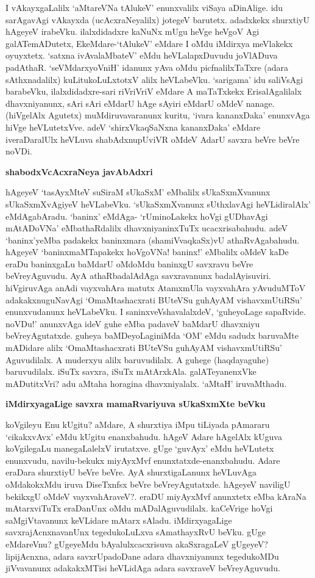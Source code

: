 I vAkayxgaLalilx `aMtareVNa tAlukeV' enunxvalilx viSaya aDinAlige. idu sarAgavAgi vAkayxda (ucAcxraNeyalilx) jotegeV barutetx. adadxkekx shurxtiyU hAgeyeV irabeVku. ilalxdidadxre kaNuNx mUgu heVge heVgoV Agi galATemADutetx, EkeMdare-`tAlukeV' eMdare I oMdu iMdirxya meVlakekx oyuyxtetx. `satxna ivAvalaMbateV' eMdu heVLalapxDuvudu joVlADuva padAthaR. `seVMdarxyoVniH' idanunx yAva oMdu picfnalilxTaTxre (adara sAthxnadalilx) kuLitukoLuLxtotxV alilx heVLabeVku. `sarigama' idu saliVsAgi barabeVku, ilalxdidadxre-sari riVriVriV eMdare A maTaTxkekx ErisalAgalilalx dhavxniyanunx, sAri sAri eMdarU hAge sAyiri eMdarU oMdeV nanage. (hiVgelAlx Agutetx) muMdiruvavaranunx kuritu, `ivara kananxDaka' enunxvAga hiVge heVLutetxVve. adeV `shirxVkaqSaNxna kananxDaka' eMdare iveraDaralUlx heVLuva shabAdxnupUviVR oMdeV AdarU savxra beVre beVre noVDi.

\noindent
\textbf{shabodxVcAcxraNeya javAbAdxri}\label{page124}

hAgeyeV `tasAyxMteV suSiraM sUkaSxM' eMbalilx sUkaSxmXvanunx sUkaSxmXvAgiyeV heVLabeVku. `sUkaSxmXvanunx sUthxlavAgi heVLidiralAlx' 
eMdAgabAradu. `baninx' eMdAga- `rUminoLakekx hoVgi gUDhavAgi mAtADoVNa' eMbathaRdalilx dhavxniyaninxTuTx ucacxrisabahudu. adeV `baninx'yeMba padakekx baninxmara (shamiVvaqkaSx)vU athaRvAgabahudu. hAgeyeV `baninxmaMTapakekx hoVgoVNa! baninx!' eMbalilx oMdeV kaDe eraDu baninxgaLu baMdarU oMdoMdu baninxgU savxravu beVre beVreyAguvudu. AyA athaRbadalAdAga savxravanunx badalAyisuviri. hiVgiruvAga anAdi vayxvahAra matutx AtamxmUla vayxvahAra yAvuduMToV adakakxnuguNavAgi `OmaMtashacxrati BUteVSu guhAyAM vishavxmUtiRSu'\label{125} enunxvudanunx heVLabeVku. I saninxveVshavalalxdeV, `guheyoLage sapaRvide. noVDu!' anunxvAga ideV guhe eMba padaveV baMdarU dhavxniyu beVreyAgutatxde. guheya baMDeyoLaginiMda `OM' eMdu sadudx baruvaMte mADidare alilx `OmaMtashacxrati BUteVSu guhAyAM vishavxmUtiRSu' Aguvudilalx. A muderxyu alilx baruvudilalx. A guhege (haqdayaguhe) baruvudilalx. iSuTx savxra, iSuTx mAtArxkAla. galATeyanenxVke mADutitxVri? adu aMtaha horagina dhavxniyalalx. `aMtaH' iruvaMthadu.

\noindent
\textbf{iMdirxyagaLige savxra mamaRvariyuva sUkaSxmXte beVku}\label{page125}

koVgileyu Enu kUgitu? aMdare, A shurxtiya iMpu tiLiyada pAmararu `cikakxvAvx' eMdu kUgitu enanxbahudu. hAgeV Adare hAgelAlx kUguva koVgilegaLu manegaLalelxV irutatxve. gUge `guvAyx' eMdu heVLutetx enunxvudu, navilu-bekukx miyAyxMvf enunxtatxde-enanxbahudu. Adare eraDara shurxtiyU beVre beVre. AyA shurxtigaLanunx heVLuvAga oMdakokxMdu iruva DiseTxnfsx beVre beVreyAgutatxde. hAgeyeV naviligU bekikxgU oMdeV vayxvahAraveV?. eraDU miyAyxMvf anunxtetx eMba kAraNa mAtarxviTuTx eraDanUnx oMdu mADalAguvudilalx. kaCeVrige hoVgi saMgiVtavanunx keVLidare mAtarx sAladu. iMdirxyagaLige savxrajAcnxnavanUnx tegedukoLuLxva sAmathayxRvU beVku. gUge eMdareVnu? gUgeyeMdu bAyalulxcacxrisuva akaSxragaLeV gUgeyeV? lipijAcnxna, adara savxrUpadoDane adara dhavxniyanunx tegedukoMDu jiVvavanunx adakakxMTisi heVLidAga adara savxraveV beVreyAguvudu. 

